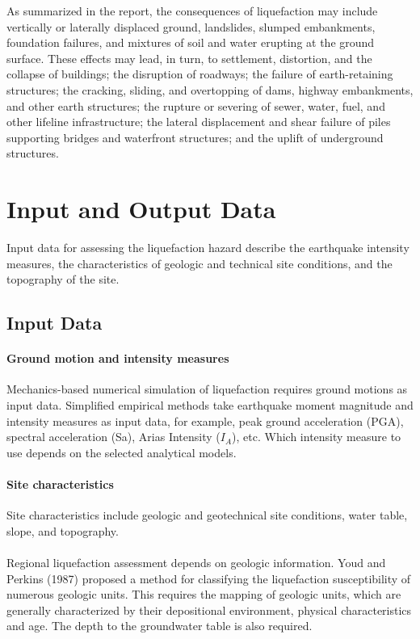 As summarized in the \cite{national2016state} report, the consequences of liquefaction may include vertically or laterally displaced ground, landslides, slumped embankments, foundation failures, and mixtures of soil and water erupting at the ground surface. These effects may lead, in turn, to settlement, distortion, and the collapse of buildings; the disruption of roadways; the failure of earth-retaining structures; the cracking, sliding, and overtopping of dams, highway embankments, and other earth structures; the rupture or severing of sewer, water, fuel, and other lifeline infrastructure; the lateral displacement and shear failure of piles supporting bridges and waterfront structures; and the uplift of underground structures.

\section{Input and Output Data}

Input data for assessing the liquefaction hazard describe the earthquake intensity measures, the characteristics of geologic and technical site conditions, and the topography of the site.

\subsection{Input Data}
\label{subsec:eq_liquefaction_input}

\paragraph{Ground motion and intensity measures}
Mechanics-based numerical simulation of liquefaction requires ground motions as input data. Simplified empirical methods take earthquake moment magnitude and intensity measures as input data, for example, peak ground acceleration (PGA), spectral acceleration (Sa), Arias Intensity ($I_A$), etc. Which intensity measure to use depends on the selected analytical models.


\paragraph{Site characteristics}
Site characteristics include geologic and geotechnical site conditions, water table, slope, and topography. \\

\\
Regional liquefaction assessment depends on geologic information.
Youd and Perkins (1987) proposed a method for classifying the liquefaction susceptibility of numerous geologic units. This requires the mapping of geologic units, which are generally characterized by their depositional environment, physical characteristics and age. The depth to the groundwater table is also required. \\

